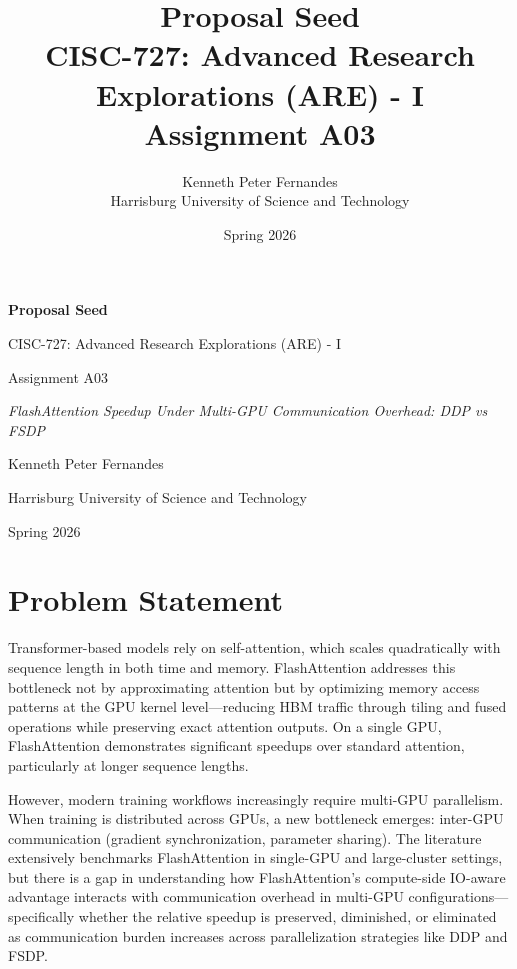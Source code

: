 \documentclass[12pt, a4paper]{article}
\title{%
    \vspace{2cm}
    \textbf{Proposal Seed} \\
    \vspace{0.5cm}
    \large CISC-727: Advanced Research Explorations (ARE) - I \\
    \vspace{0.3cm}
    \large Assignment A03
}
\author{%
    Kenneth Peter Fernandes \\
    \vspace{0.3cm}
    Harrisburg University of Science and Technology
}
\date{Spring 2026}
\begin{document}
\begin{titlepage}
    \centering
    \vspace*{2cm}
    {\LARGE \textbf{Proposal Seed} \par}
    \vspace{1cm}
    {\large CISC-727: Advanced Research Explorations (ARE) - I \par}
    \vspace{0.5cm}
    {\large Assignment A03 \par}
    \vspace{1.5cm}
    {\large \textit{FlashAttention Speedup Under Multi-GPU Communication Overhead: DDP vs FSDP} \par}
    \vspace{1.5cm}
    {\Large Kenneth Peter Fernandes \par}
    \vspace{0.5cm}
    {\large Harrisburg University of Science and Technology \par}
    \vspace{1cm}
    {\large Spring 2026 \par}
\end{titlepage}

\section{Problem Statement}

Transformer-based models rely on self-attention, which scales quadratically with sequence length in both time and memory. FlashAttention addresses this bottleneck not by approximating attention but by optimizing memory access patterns at the GPU kernel level---reducing HBM traffic through tiling and fused operations while preserving exact attention outputs. On a single GPU, FlashAttention demonstrates significant speedups over standard attention, particularly at longer sequence lengths.

However, modern training workflows increasingly require multi-GPU parallelism. When training is distributed across GPUs, a new bottleneck emerges: inter-GPU communication (gradient synchronization, parameter sharing). The literature extensively benchmarks FlashAttention in single-GPU and large-cluster settings, but there is a gap in understanding how FlashAttention's compute-side IO-aware advantage interacts with communication overhead in multi-GPU configurations---specifically whether the relative speedup is preserved, diminished, or eliminated as communication burden increases across parallelization strategies like DDP and FSDP.
\end{document}
